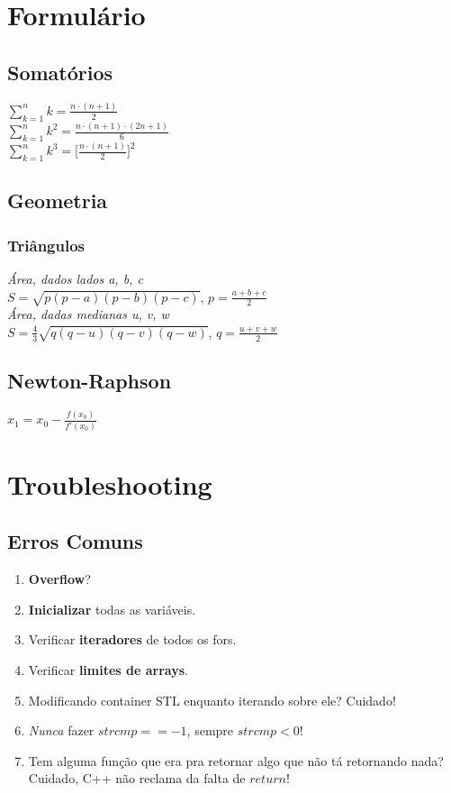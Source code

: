 \documentclass[12pt,a4paper]{article}
\begin{document}
	\twocolumn
	\section{Formulário}
		\subsection*{Somatórios}
			\( \sum_{k = 1}^{n} k = \frac{n \cdot (n + 1)}{2} \) \\
			\( \sum_{k = 1}^{n} k^2 = \frac{n \cdot (n + 1) \cdot (2n + 1)}{6} \) \\
			\( \sum_{k = 1}^{n} k^3 = \big[\frac{n \cdot (n + 1)}{2}\big]^2 \)
		\subsection*{Geometria}
			\subsubsection*{Triângulos}
				\emph{Área, dados lados a, b, c} \\
				\( S = \sqrt{p (p - a) (p - b) (p - c)} \), \( p = \frac{a + b + c}{2} \) \\
				\emph{Área, dadas medianas u, v, w} \\
				\( S = \frac{4}{3} \sqrt{q (q - u) (q - v) (q - w)} \), \( q = \frac{u + v + w}{2} \)
		\subsection*{Newton-Raphson}
				\( x_1 = x_0 - \frac{f(x_0)}{f'(x_0)} \)

	\onecolumn
	\section{Troubleshooting}
		\subsection{Erros Comuns}
			\begin{enumerate}
				\item \textbf{Overflow}?
				\item \textbf{Inicializar} todas as variáveis.
				\item Verificar \textbf{iteradores} de todos os fors.
				\item Verificar \textbf{limites de arrays}.
				\item Modificando container STL enquanto iterando sobre ele? Cuidado!
				\item \emph{Nunca} fazer $strcmp == -1$, sempre $strcmp < 0$!
				\item Tem alguma função que era pra retornar algo que não tá retornando nada? Cuidado, C++ não reclama da falta de $return$!
			\end{enumerate}
\end{document}
